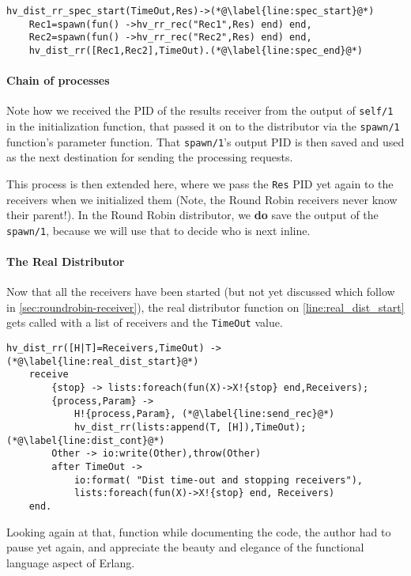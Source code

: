 \begin{lstlisting}[name=hvp2]
%Two specific and specified servers
hv_dist_rr_spec_start(TimeOut,Res)->(*@\label{line:spec_start}@*)
	Rec1=spawn(fun() ->hv_rr_rec("Rec1",Res) end) end,
	Rec2=spawn(fun() ->hv_rr_rec("Rec2",Res) end) end,
	hv_dist_rr([Rec1,Rec2],TimeOut).(*@\label{line:spec_end}@*)
\end{lstlisting}
 

\paragraph{Chain of processes}
\label{sec:chain-processes}

Note how we received the PID of the results receiver from the output
of \texttt{self/1} in the initialization function, that passed it on
to the distributor via the \texttt{spawn/1} function's parameter
function. That \texttt{spawn/1}'s output PID is then saved and used as
the next destination for sending the processing requests.

This process is then extended here, where we pass the \texttt{Res} PID
yet again to the receivers when we initialized them (Note, the Round
Robin receivers never know their parent!). In the Round Robin
distributor, we \textbf{do} save the output of the \texttt{spawn/1},
because we will use that to decide who is next inline.



\paragraph{The Real Distributor}
Now that all the receivers have been started (but not yet discussed
which follow in \autoref{sec:roundrobin-receiver}), the real
distributor function on \autoref{line:real_dist_start} gets called
with a list of receivers and the \texttt{TimeOut} value.

\begin{lstlisting}[name=hvp2]
hv_dist_rr([H|T]=Receivers,TimeOut) ->(*@\label{line:real_dist_start}@*)
	receive
		{stop} -> lists:foreach(fun(X)->X!{stop} end,Receivers);
		{process,Param} -> 
			H!{process,Param}, (*@\label{line:send_rec}@*)
			hv_dist_rr(lists:append(T, [H]),TimeOut);(*@\label{line:dist_cont}@*)
		Other -> io:write(Other),throw(Other)
		after TimeOut ->
			io:format( "Dist time-out and stopping receivers"),
			lists:foreach(fun(X)->X!{stop} end, Receivers)
	end.
\end{lstlisting}

Looking again at that, function while documenting the code, the author had to
pause yet again, and appreciate the beauty and elegance of the
functional language aspect of Erlang.

